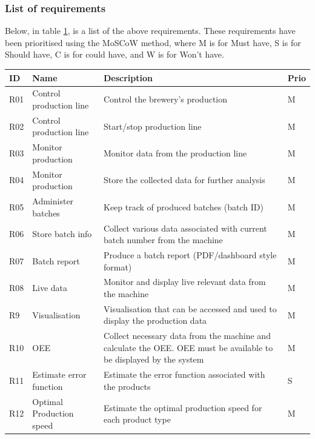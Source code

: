\subsubsection{List of requirements}
Below, in table \ref{table:Requirements}, is a list of the above requirements. These requirements have been
prioritised using the MoSCoW method, where M is for Must have, S is for
Should have, C is for could have, and W is for Won't have. 

\begin{table}[H]
    \begin{tabularx}{\textwidth}{|>{\RaggedRight}p{1cm}|>{\RaggedRight}p{4cm}|>{\RaggedRight}X|>{\RaggedRight}p{1cm}|}
        \hline
        \textbf{ID} & \textbf{Name} & \textbf{Description} & \textbf{Prio} \\
        \hline
        R01 & Control production line & Control the brewery's production & M \\
        \hline
        R02 & Control production line & Start/stop production line & M \\
        \hline
        R03 & Monitor production & Monitor data from the production line & M \\
        \hline
        R04 & Monitor production & Store the collected data for further analysis & M \\
        \hline
        R05 & Administer batches & Keep track of produced batches (batch ID) & M \\
        \hline
        R06 & Store batch info & Collect various data associated with current batch number from the machine & M \\
        \hline
        R07 & Batch report & Produce a batch report (PDF/dashboard style format) & M \\
        \hline
        R08 & Live data & Monitor and display live relevant data from the machine & M \\
        \hline
        R9 & Visualisation & Visualisation that can be accessed and used to display the production data & M \\
        \hline
        R10 & OEE & Collect necessary data from the machine and calculate the OEE. OEE must be available to be displayed by the system & M \\
        \hline
        R11 & Estimate error function & Estimate the error function associated with the products & S \\
        \hline
        R12 & Optimal Production speed & Estimate the optimal production speed for each product type & M \\
        \hline
    \end{tabularx}
    \label{table:Requirements}
\end{table}

